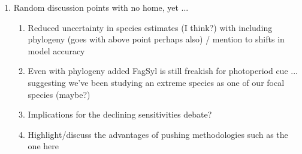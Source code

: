 \documentclass{article}\usepackage[]{graphicx}\usepackage[]{color}
\begin{document}
\begin{enumerate}
\item Random discussion points with no home, yet ... 
\begin{enumerate}
\item Reduced uncertainty in species estimates (I think?) with including phylogeny (goes with above point perhaps also) / mention to shifts in model accuracy
\item Even with phylogeny added FagSyl is still freakish for photoperiod cue ... suggesting we've been studying an extreme species as one of our focal species (maybe?)
\item Implications for the declining sensitivities debate?
\item Highlight/discuss the advantages of pushing methodologies such as the one here

\end{enumerate}
\end{enumerate}

\end{document}
